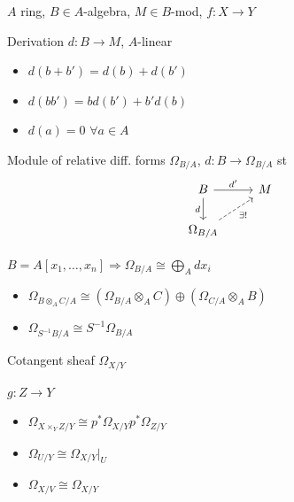 $A$ ring, $B \in A$-algebra, $M \in B$-mod, $f : X \to Y$

\begin{definition}Derivation $d:B \to M$, $A$-linear
\begin{itemize}[topsep=-6pt, itemsep=0pt]
    \item $d(b+b') = d(b) + d(b')$
    \item $d(bb') = b d(b') + b' d(b)$
    \item $d(a) = 0$ $\forall a \in A$
\end{itemize}
\end{definition}

\begin{definition} Module of relative diff. forms $\Omega_{B/A}$, $d : B \to \Omega_{B/A}$ st
\[\begin{tikzcd}
	B & M \\
	{\Omega_{B/A}}
	\arrow["{d'}", from=1-1, to=1-2]
	\arrow["d"', from=1-1, to=2-1]
	\arrow["{\exists !}"', dashed, from=2-1, to=1-2]
\end{tikzcd}\]
\end{definition}

\begin{proposition} $B = A[x_1, \ldots, x_n] \Rightarrow \Omega_{B/A} \cong \bigoplus_ A dx_i$
\end{proposition}

\begin{proposition}
\begin{itemize}[topsep=-6pt, itemsep=0pt]
    \item $\Omega _{B \otimes  _A C / A} \cong (\Omega_{B/A} \otimes _A C) \oplus (\Omega_{C/A} \otimes _A B)$
    \item $\Omega_{S^{-1}B/A} \cong S^{-1}\Omega_{B/A}$
\end{itemize}
\end{proposition}

\begin{definition}Cotangent sheaf $\Omega _{X/Y}$
\end{definition}

\begin{proposition} $g: Z \to Y$
    \begin{itemize}[topsep=-6pt, itemsep=0pt]
        \item $\Omega_{X \times _Y Z / Y} \cong p^* \Omega _{X/Y} p^* \Omega_{Z/Y}$
        \item $\Omega _{U/Y} \cong \Omega _{X/Y}|_U$
        \item $\Omega _{X/V} \cong \Omega_{X/Y}$
    \end{itemize}
\end{proposition}


